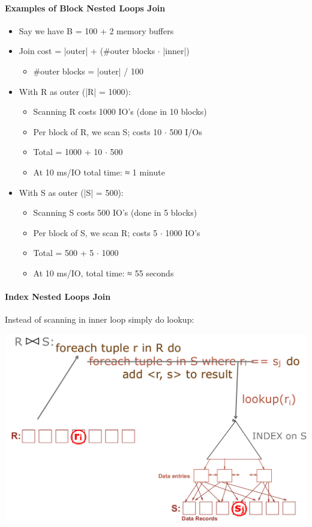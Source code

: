 \paragraph{Examples of Block Nested Loops Join}
\begin{itemize}
\item Say we have B = 100 + 2 memory buffers
\item Join cost = |outer| + (\#outer blocks $\cdot$ |inner|)
  \begin{itemize}
  \item \#outer blocks = |outer| / 100
  \end{itemize}

\item With R as outer (|R| = 1000):
  \begin{itemize}
  \item Scanning R costs 1000 IO's (done in 10 blocks)
  \item Per block of R, we scan S; costs 10 $\cdot$ 500 I/Os
  \item Total = 1000 + 10 $\cdot$ 500
  \item At 10 ms/IO total time: ≈ 1 minute
  \end{itemize}

\item With S as outer (|S| = 500):
  \begin{itemize}
  \item Scanning S costs 500 IO's (done in 5 blocks)
  \item Per block of S, we scan R; costs 5 $\cdot$ 1000 IO's
  \item Total = 500 + 5 $\cdot$ 1000
  \item At 10 ms/IO, total time: ≈ 55 seconds
  \end{itemize}
\end{itemize}

\paragraph{Index Nested Loops Join}
Instead of scanning in inner loop simply do lookup:

\includegraphics[scale=0.2]{graphics/index-nested-loop-join.png}


